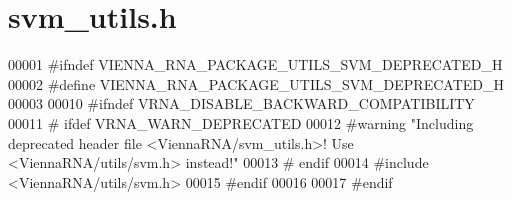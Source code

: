 \hypertarget{svm__utils_8h_source}{}\section{svm\+\_\+utils.\+h}
\label{svm__utils_8h_source}

\begin{DoxyCode}
00001 \textcolor{preprocessor}{#ifndef VIENNA\_RNA\_PACKAGE\_UTILS\_SVM\_DEPRECATED\_H}
00002 \textcolor{preprocessor}{#define VIENNA\_RNA\_PACKAGE\_UTILS\_SVM\_DEPRECATED\_H}
00003 
00010 \textcolor{preprocessor}{#ifndef VRNA\_DISABLE\_BACKWARD\_COMPATIBILITY}
00011 \textcolor{preprocessor}{# ifdef VRNA\_WARN\_DEPRECATED}
00012 \textcolor{preprocessor}{#warning "Including deprecated header file <ViennaRNA/svm\_utils.h>! Use <ViennaRNA/utils/svm.h> instead!"}
00013 \textcolor{preprocessor}{# endif}
00014 \textcolor{preprocessor}{#include <ViennaRNA/utils/svm.h>}
00015 \textcolor{preprocessor}{#endif}
00016 
00017 \textcolor{preprocessor}{#endif}
\end{DoxyCode}
